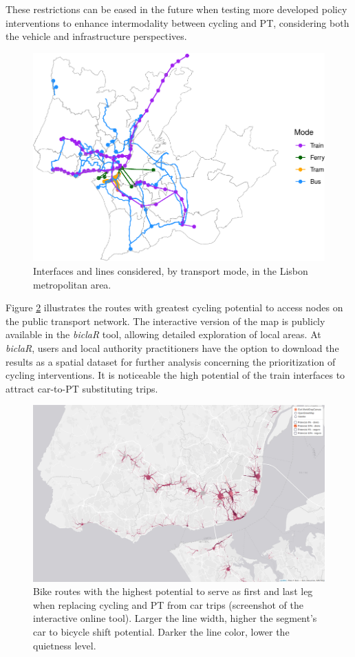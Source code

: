 \documentclass[review, doubleblind, 3p,
authoryear]{elsarticle} %
\begin{document}
These restrictions can be eased in the future when testing more
developed policy interventions to enhance intermodality between cycling
and PT, considering both the vehicle and infrastructure perspectives.

\begin{figure}

{\centering \includegraphics[width=0.6\linewidth,]{PaperCEUS_rev2_word_files/figure-latex/map1-1} 

}

\caption{Interfaces and lines considered, by transport mode, in the Lisbon metropolitan area.}\label{fig:map1}
\end{figure}

Figure \ref{fig:map2} illustrates the routes with greatest cycling
potential to access nodes on the public transport network. The
interactive version of the map is publicly available in the
\emph{biclaR} tool, allowing detailed exploration of local areas. At
\emph{biclaR}, users and local authority practitioners have the option
to download the results as a spatial dataset for further analysis
concerning the prioritization of cycling interventions. It is noticeable
the high potential of the train interfaces to attract car-to-PT
substituting trips.

\begin{figure}

{\centering \includegraphics[width=0.8\linewidth,]{img/map2} 

}

\caption{Bike routes with the highest potential to serve as first and last leg when replacing cycling and PT from car trips (screenshot of the interactive online tool). Larger the line width, higher the segment's car to bicycle shift potential. Darker the line color, lower the quietness level.}\label{fig:map2}
\end{figure}
\end{document}
